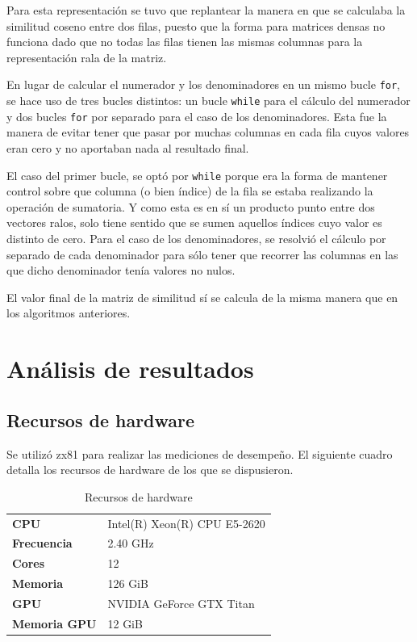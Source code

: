\documentclass[11pt, a4paper]{article}
\begin{document}
  Para esta representación se tuvo que replantear la manera en que se calculaba
  la similitud coseno entre dos filas, puesto que la forma para matrices densas
  no funciona dado que no todas las filas tienen las mismas columnas para la
  representación rala de la matriz.

  En lugar de calcular el numerador y los denominadores en un mismo bucle
  \texttt{for}, se hace uso de tres bucles distintos: un bucle \texttt{while}
  para el cálculo del numerador y dos bucles \texttt{for} por separado para el
  caso de los denominadores. Esta fue la manera de evitar tener que pasar por
  muchas columnas en cada fila cuyos valores eran cero y no aportaban nada al
  resultado final.

  El caso del primer bucle, se optó por \texttt{while} porque era la forma de
  mantener control sobre que columna (o bien índice) de la fila se estaba
  realizando la operación de sumatoria. Y como esta es en sí un producto punto
  entre dos vectores ralos, solo tiene sentido que se sumen aquellos índices
  cuyo valor es distinto de cero.  Para el caso de los denominadores, se
  resolvió el cálculo por separado de cada denominador para sólo tener que
  recorrer las columnas en las que dicho denominador tenía valores no nulos.

  El valor final de la matriz de similitud sí se calcula de la misma manera que
  en los algoritmos anteriores.

  \section{Análisis de resultados}\label{sec:resultados}

  \subsection{Recursos de hardware}

  Se utilizó zx81 para realizar las mediciones de desempeño. El siguiente
  cuadro detalla los recursos de hardware de los que se dispusieron.

  \begin{table}[h]
      \centering
      \begin{tabular}{ll}
          \hline
          \textbf{CPU} & Intel(R) Xeon(R) CPU E5-2620 \\
          \textbf{Frecuencia} & 2.40 GHz \\
          \textbf{Cores} & 12 \\
          \textbf{Memoria} & 126 GiB \\
          \textbf{GPU} & NVIDIA GeForce GTX Titan \\
          \textbf{Memoria GPU} & 12 GiB \\
          \hline
      \end{tabular}
      \caption*{Recursos de hardware}
  \end{table}
\end{document}
